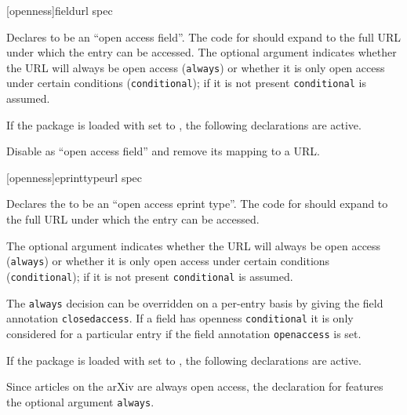 \documentclass[DIV=9]{scrartcl}
\begin{document}
\begin{ltxsyntax}
[openness]{field}{url spec}

Declares  to be an \enquote{open access field}.
The code for  should expand to the full URL under which the entry
can be accessed.
The optional  argument indicates whether the URL will always be
open access (\texttt{always}) or whether it is only open access under certain
conditions (\texttt{conditional});
if it is not present \texttt{conditional} is assumed.

If the package is loaded with  set to ,
the following declarations are active.
\begin{biblatexcode}
\end{biblatexcode}


Disable  as \enquote{open access field} and remove its mapping
to a URL.

[openness]{eprinttype}{url spec}

Declares the   to be an
\enquote{open access eprint type}.
The code for  should expand to the full URL under which the entry
can be accessed.

The optional  argument indicates whether the URL will always be
open access (\texttt{always}) or whether it is only open access under certain
conditions (\texttt{conditional});
if it is not present \texttt{conditional} is assumed.

The \texttt{always} decision can be overridden on a per-entry basis by
giving the field annotation \texttt{closedaccess}.
If a field has openness \texttt{conditional} it is only considered for a
particular entry if the field annotation \texttt{openaccess} is set.

If the package is loaded with  set to ,
the following declarations are active.
\begin{biblatexcode}
\end{biblatexcode}
Since articles on the arXiv are always open access, the declaration
for  features the optional  argument
\texttt{always}.


\end{ltxsyntax}
\end{document}
